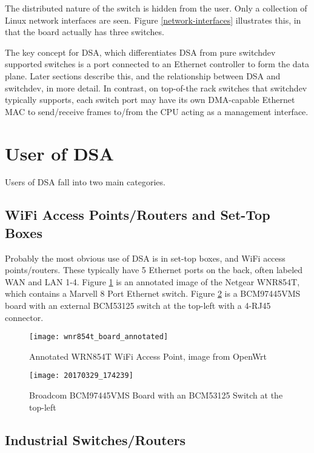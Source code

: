 \documentclass[letterpaper]{article}
\begin{document}
The distributed nature of the switch is hidden from the user. Only a
collection of Linux network interfaces are seen. Figure
\ref{network-interfaces} illustrates this, in that the board actually
has three switches.

The key concept for DSA, which differentiates DSA from pure switchdev
supported switches is a port connected to an Ethernet controller to
form the data plane. Later sections describe this, and the
relationship between DSA and switchdev, in more detail. In contrast,
on top-of-the rack switches that switchdev typically supports, each
switch port may have its own DMA-capable Ethernet MAC to send/receive
frames to/from the CPU acting as a management interface.

\section{User of DSA}

Users of DSA fall into two main categories.

\subsection{WiFi Access Points/Routers and Set-Top Boxes}

Probably the most obvious use of DSA is in set-top boxes, and WiFi
access points/routers. These typically have 5 Ethernet ports on the
back, often labeled WAN and LAN 1-4. Figure \ref{wrn854t} is an
annotated image of the Netgear WNR854T, which contains a Marvell 8
Port Ethernet switch. Figure \ref{BCM97445VMS} is a BCM97445VMS board
with an external BCM53125 switch at the top-left with a 4-RJ45
connector.

\begin{figure}[ht]
  \centering
  \texttt{[image: wnr854t\_board\_annotated]}
  \caption{Annotated WRN854T WiFi Access Point, image from OpenWrt}
  \label{wrn854t}
\end{figure}

\begin{figure}[ht]
  \centering
  \texttt{[image: 20170329\_174239]}
  \caption{Broadcom BCM97445VMS Board with an BCM53125 Switch at the top-left}
  \label{BCM97445VMS}
\end{figure}

\subsection{Industrial Switches/Routers}
\end{document}
